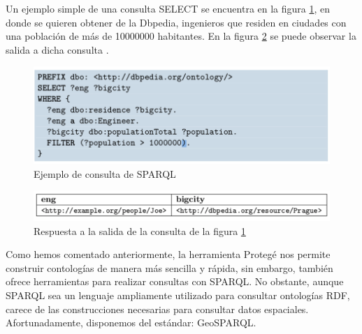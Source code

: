 Un ejemplo simple de una consulta SELECT se encuentra en la figura \ref{fig:ejemplo-sparql}, en donde se quieren obtener de la Dbpedia, ingenieros que residen en ciudades con una población de más de 10000000 habitantes. En la figura \ref{fig:salida-sparql} se puede observar la salida a dicha consulta \cite{tesis-otro}.

\begin{figure}[H]
	\centering
	\includegraphics[width=0.9\linewidth]{imagenes/capitulo3/ejemplo-sparql}
	\caption{Ejemplo de consulta de SPARQL \cite{tesis-otro}}
	\label{fig:ejemplo-sparql}
\end{figure}

\begin{figure}[H]
	\centering
	\includegraphics[width=0.9\linewidth]{imagenes/capitulo3/salida-sparql}
	\caption{Respuesta a la salida de la consulta de la figura \ref{fig:ejemplo-sparql}}
	\label{fig:salida-sparql}
\end{figure}



Como hemos comentado anteriormente, la herramienta Protegé nos permite construir contologías de manera más sencilla y rápida, sin embargo, también ofrece herramientas para realizar consultas con SPARQL. No obstante, aunque SPARQL sea un lenguaje ampliamente utilizado para consultar ontologías RDF, carece de las construcciones necesarias para consultar datos espaciales. Afortunadamente, disponemos del estándar: GeoSPARQL.

